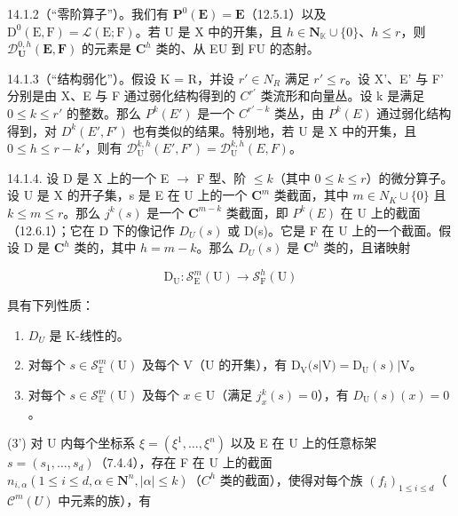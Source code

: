 14.1.2（“零阶算子”）。我们有 \(\mathbf{P}^0 (\mathbf{E}) = \mathbf{E}\)（12.5.1）以及 \(\mathrm{D}^0 (\mathrm{E},\mathrm{F}) = \mathcal{L}(\mathrm{E};\mathrm{F})\)。若 U 是 X 中的开集，且 \(h\in \mathbf{N}_{\mathbb{K}}\cup \{0\}\)、\(h\leqslant r\)，则 \(\mathcal{D}_{\mathbf{U}}^{0,h}(\mathbf{E},\mathbf{F})\) 的元素是 \(\mathbf{C}^h\) 类的、从 E\textbar U 到 F\textbar U 的态射。

14.1.3（“结构弱化”）。假设 K = R，并设 \(r' \in N_{R}\) 满足 \(r' \leqslant r\)。设 X'、E' 与 F' 分别是由 X、E 与 F 通过弱化结构得到的 \(C^{r'}\) 类流形和向量丛。设 k 是满足 \(0 \leqslant k \leqslant r'\) 的整数。那么 \(P^{k}(E')\) 是一个 \(C^{r'-k}\) 类丛，由 \(P^{k}(E)\) 通过弱化结构得到，对 \(D^{k}(E', F')\) 也有类似的结果。特别地，若 U 是 X 中的开集，且 \(0 \leqslant h \leqslant r - k'\)，则有 \(\mathcal{D}_{\mathrm{U}}^{k,h}(E', F') = \mathcal{D}_{\mathrm{U}}^{k,h}(E, F)\)。

14.1.4. 设 D 是 X 上的一个 E \(\to\) F 型、阶 \(\leqslant k\)（其中 \(0 \leqslant k \leqslant r\)）的微分算子。设 U 是 X 的开子集，s 是 E 在 U 上的一个 \(\mathbf{C}^{m}\) 类截面，其中 \(m \in N _{K} \cup \{0\}\) 且 \(k \leqslant m \leqslant r\)。那么 \(j^{k}(s)\) 是一个 \(\mathbf{C}^{m-k}\) 类截面，即 \(P^{k}(E)\) 在 U 上的截面（12.6.1）；它在 D 下的像记作 \(D_{U}(s)\) 或 D(s)。它是 F 在 U 上的一个截面。假设 D 是 \(\mathbf{C}^{h}\) 类的，其中 \(h=m-k\)。那么 \(D_{U}(s)\) 是 \(\mathbf{C}^{h}\) 类的，且诸映射

\[
\mathrm{D} _ {\mathrm{U}} \colon \mathcal {S} _ {\mathrm{E}} ^ {m} (\mathrm{U}) \rightarrow \mathcal {S} _ {\mathrm{F}} ^ {h} (\mathrm{U})
\]

具有下列性质：

\begin{enumerate}
\def\labelenumi{(\arabic{enumi})}
\item
  \(D_{U}\) 是 K-线性的。
\item
  对每个 \(s \in \mathcal{S}_{\mathbb{E}}^{m}(\mathrm{U})\) 及每个 \(\mathrm{V}\)（\(\mathrm{U}\) 的开集），有 \(\mathrm{D}_{\mathrm{V}}(s|\mathrm{V}) = \mathrm{D}_{\mathrm{U}}(s)|\mathrm{V}\)。
\item
  对每个 \(s \in \mathcal{S}_{\mathbb{E}}^{m}(\mathrm{U})\) 及每个 \(x \in \mathrm{U}\)（满足 \(j_{x}^{k}(s) = 0\)），有 \(D_{\mathrm{U}}(s)(x) = 0\)。
\end{enumerate}

(3') 对 U 内每个坐标系 \(\xi = (\xi^1, \ldots, \xi^n)\) 以及 E 在 U 上的任意标架 \(s = (s_1, \ldots, s_d)\)（7.4.4），存在 F 在 U 上的截面 \(n_{i,\alpha}(1 \leqslant i \leqslant d, \alpha \in \mathbf{N}^n, |\alpha| \leqslant k)\)（\(C^h\) 类的截面），使得对每个族 \((f_i)_{1 \leqslant i \leqslant d}\)（\(\mathcal{C}^m(U)\) 中元素的族），有

